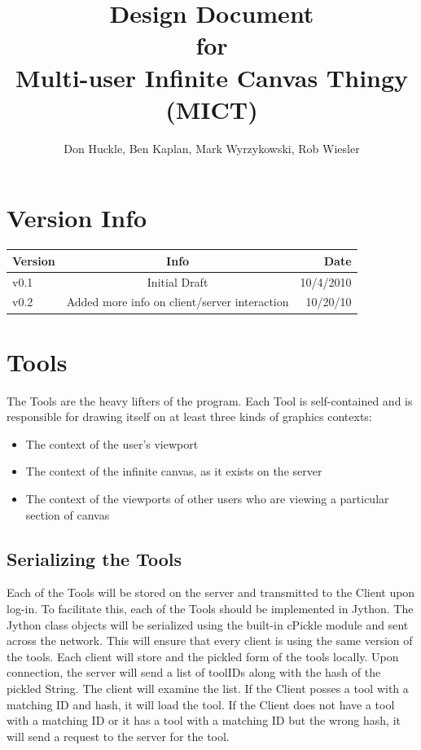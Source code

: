 \documentclass[11pt,oneside,a4paper]{article}
\title{Design Document \\ for \\ Multi-user Infinite Canvas Thingy (MICT)}
\author{Don Huckle, Ben Kaplan, Mark Wyrzykowski, Rob Wiesler}
\begin{document}
\maketitle
\tableofcontents
\pagebreak
\section{Version Info}

\begin{tabular}{| l | c | r |}  \hline
\textbf{Version} & \textbf{Info} & \textbf{Date} \\ \hline
v0.1 & Initial Draft & 10/4/2010 \\ \hline
v0.2 & Added more info on client/server interaction & 10/20/10 \\ \hline
\end{tabular}

\section{Tools}
  The Tools are the heavy lifters of the program. Each Tool is self-contained
  and is responsible for drawing itself on at least three kinds of graphics
  contexts:
 \begin{itemize}
  \item The context of the user's viewport
  \item The context of the infinite canvas, as it exists on the server
  \item The context of the viewports of other users who are viewing a particular section of canvas
 \end{itemize}

 \subsection{Serializing the Tools}
  Each of the Tools will be stored on the server and transmitted to the Client
  upon log-in. To facilitate this, each of the Tools should be implemented in
  Jython. The Jython class objects will be serialized using the built-in
  cPickle module and sent across the network. This will ensure that every
  client is using the same version of the tools. Each client will store and
  the pickled form of the tools locally. Upon connection, the server will send a list of
  toolIDs along with the hash of the pickled String. The client will examine
  the list. If the Client posses a tool with a matching ID and hash, it will
  load the tool. If the Client does not have a tool with a matching ID or it
  has a tool with a matching ID but the wrong hash, it will send a request to
  the server for the tool.
\end{document}
